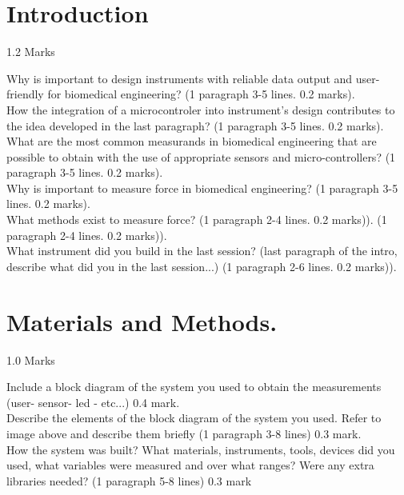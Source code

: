 \documentclass[journal]{IEEEtran}
\begin{document}
\section{Introduction   }
\begin{flushright} 1.2 Marks \end{flushright}


 Why is important to design instruments with reliable data output and user-friendly for biomedical engineering?  (1 paragraph 3-5 lines. 0.2 marks).\\[0.1in] 
How the integration of a microcontroler into instrument's design  contributes to the idea developed in the last paragraph? (1 paragraph 3-5 lines. 0.2 marks).\\[0.1in] 
What are the most common measurands in biomedical engineering that are possible to obtain with the use of appropriate sensors and micro-controllers? (1 paragraph 3-5 lines. 0.2 marks).\\[0.15in] 
Why is important to measure force in biomedical engineering? (1 paragraph 3-5 lines. 0.2 marks).\\[0.1in] 
What methods exist to measure force? (1 paragraph 2-4 lines. 0.2 marks)).
 (1 paragraph 2-4 lines. 0.2 marks)).\\[0.1in] 
 
 What instrument did you build in the last session? (last paragraph of the intro, describe what did you in the last session...) (1 paragraph 2-6 lines. 0.2 marks)).\\[0.1in]

\section{Materials and Methods. }
\begin{flushright} 1.0 Marks \end{flushright}
Include a block diagram of the system you used to obtain the measurements (user- sensor- led - etc...) 0.4 mark. \\[0.15in]
Describe the elements of the block diagram of the system you used. Refer to image above and describe them briefly (1 paragraph 3-8 lines) 0.3 mark.\\[0.15in]
How the system was built?  What materials, instruments, tools, devices did you used, what variables were measured and over what ranges? Were any extra libraries needed? (1 paragraph 5-8 lines) 0.3 mark\\
\end{document}
